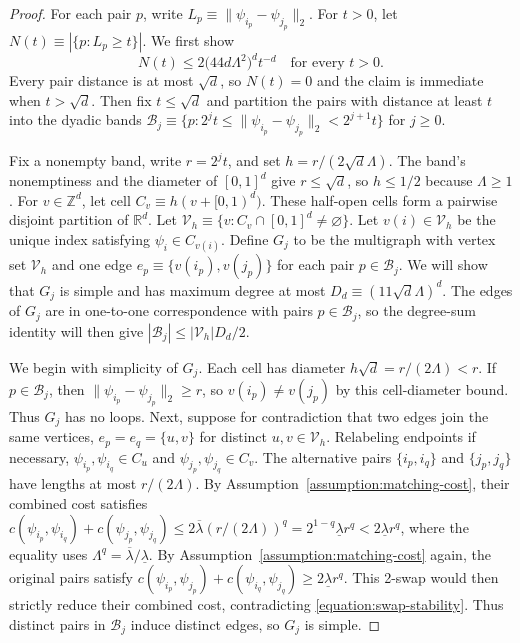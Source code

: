 \documentclass[10pt,a4paper]{amsart}
\begin{document}
\begin{proof}
For each pair $p$, write $L_p\equiv\|\psi_{i_p}-\psi_{j_p}\|_2$.
For $t>0$, let $N(t)\equiv|\{p:L_p\geq t\}|$.
We first show
\begin{equation}\label{equation:proof-long-edge-count}
N(t) \leq 2\bigl(44d\Lambda^2\bigr)^d t^{-d} \quad \text{for every }t>0.
\end{equation}
Every pair distance is at most $\sqrt d$, so $N(t) = 0$ and the claim is immediate when $t>\sqrt d$.
Then fix $t\leq\sqrt d$ and partition the pairs with distance at least $t$ into the dyadic bands $\mathcal B_j\equiv\{p:2^jt\leq\|\psi_{i_p}-\psi_{j_p}\|_2<2^{j+1}t\}$ for $j\geq0$.

Fix a nonempty band, write $r=2^jt$, and set $h=r/(2\sqrt d\Lambda)$.
The band's nonemptiness and the diameter of $[0,1]^d$ give $r\leq\sqrt d$, so $h\leq1/2$ because $\Lambda\geq1$.
For $v\in\mathbb Z^d$, let cell $C_v\equiv h(v+[0,1)^d)$.
These half-open cells form a pairwise disjoint partition of $\mathbb R^d$.
Let $\mathcal V_h\equiv\{v:C_v\cap[0,1]^d\neq\varnothing\}$.
Let $v(i)\in\mathcal V_h$ be the unique index satisfying $\psi_i\in C_{v(i)}$.
Define $G_j$ to be the multigraph with vertex set $\mathcal V_h$ and one edge $e_p\equiv\{v(i_p),v(j_p)\}$ for each pair $p\in\mathcal B_j$.
We will show that $G_j$ is simple and has maximum degree at most $D_d\equiv(11\sqrt d\Lambda)^d$.
The edges of $G_j$ are in one-to-one correspondence with pairs $p\in\mathcal B_j$, so the degree-sum identity will then give $|\mathcal B_j|\leq|\mathcal V_h|D_d/2$.

We begin with simplicity of $G_j$.
Each cell has diameter $h\sqrt d=r/(2\Lambda)<r$.
If $p\in\mathcal B_j$, then $\|\psi_{i_p}-\psi_{j_p}\|_2\geq r$, so $v(i_p)\neq v(j_p)$ by this cell-diameter bound.
Thus $G_j$ has no loops.
Next, suppose for contradiction that two edges join the same vertices, $e_p=e_q=\{u,v\}$ for distinct $u,v\in\mathcal V_h$.
Relabeling endpoints if necessary, $\psi_{i_p},\psi_{i_q}\in C_u$ and $\psi_{j_p},\psi_{j_q}\in C_v$.
The alternative pairs $\{i_p,i_q\}$ and $\{j_p,j_q\}$ have lengths at most $r/(2\Lambda)$.
By Assumption~\ref{assumption:matching-cost}, their combined cost satisfies $c(\psi_{i_p},\psi_{i_q})+c(\psi_{j_p},\psi_{j_q})\leq2\overline\lambda(r/(2\Lambda))^q=2^{1-q}\underline\lambda r^q<2\underline\lambda r^q$, where the equality uses $\Lambda^q=\overline\lambda/\underline\lambda$.
By Assumption~\ref{assumption:matching-cost} again, the original pairs satisfy $c(\psi_{i_p},\psi_{j_p})+c(\psi_{i_q},\psi_{j_q})\geq2\underline\lambda r^q$.
This 2-swap would then strictly reduce their combined cost, contradicting \eqref{equation:swap-stability}.
Thus distinct pairs in $\mathcal B_j$ induce distinct edges, so $G_j$ is simple.


\end{proof}
\end{document}
